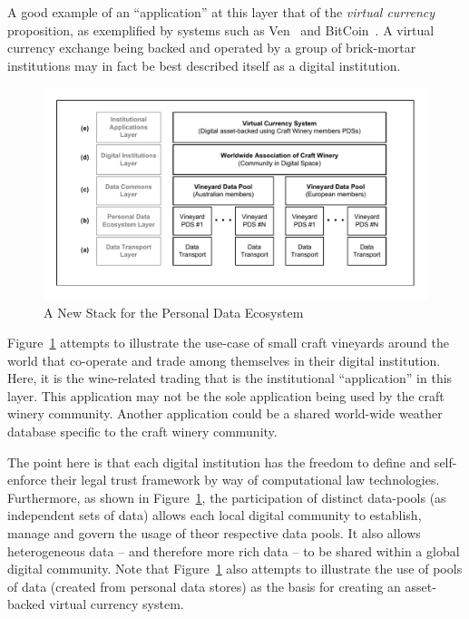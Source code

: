 \begin{description}
A good example of an ``application'' at this layer
that of the {\em virtual currency} proposition,
as exemplified by systems such as Ven~\cite{Stalnaker2013}
and BitCoin~\cite{BarberBoyen2012}.
A virtual currency exchange being backed and operated
by a group of brick-mortar institutions
may in fact be best described itself as a digital institution.

\begin{figure}[!t]
\centering
\includegraphics[width=7in]{figure-vineyard-stack}
\caption{A New Stack for the Personal Data Ecosystem}
\label{fig:vineyard-stack}
\end{figure}


Figure~\ref{fig:vineyard-stack} attempts to illustrate
the use-case of small craft vineyards around the world
that co-operate and trade among themselves in their
digital institution.  
Here, it is the wine-related trading that is
the institutional ``application'' in this layer.
This application may not be the sole application being
used by the craft winery community.
Another application could be a shared world-wide weather
database specific to the craft winery community.

The point here is that each digital institution
has the freedom to define and self-enforce their
legal trust framework by way of computational law technologies.
Furthermore, as shown in Figure~\ref{fig:vineyard-stack},
the participation of distinct data-pools (as independent
sets of data) allows each local digital community
to establish, manage and govern the usage of theor respective
data pools.
It also allows heterogeneous data -- and therefore more rich data --
to be shared within a global digital community.
Note that Figure~\ref{fig:vineyard-stack} also attempts to illustrate
the use of pools of data (created from personal data stores)
as the basis for creating an asset-backed virtual currency system.






\end{description}



